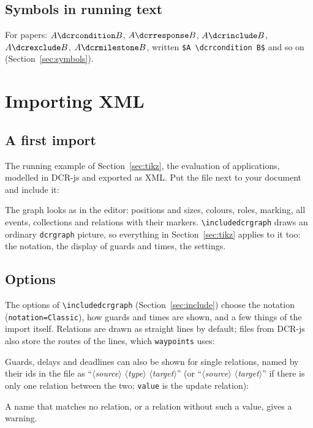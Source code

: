 \documentclass[a4paper,11pt]{article}
\newcommand\example[1]{%
  \begin{tcolorbox}[colback=white, colframe=black!25, boxrule=0.4pt,
      arc=1mm, left=2mm, right=2mm, halign lower=center]
    
    \tcblower
    
  \end{tcolorbox}}
\newcommand\cs[1]{\texttt{\textbackslash#1}}
\newcommand\key[1]{\texttt{#1}}
\newcommand\meta[1]{\ensuremath{\langle}\textit{#1}\ensuremath{\rangle}}
\begin{document}
\subsection{Symbols in running text}
For papers: $A \dcrcondition B$, $A \dcrresponse B$, $A \dcrinclude B$,
$A \dcrexclude B$, $A \dcrmilestone B$, written
\verb|$A \dcrcondition B$| and so on (Section~\ref{sec:symbols}).

\section{Importing XML}\label{sec:import}

\subsection{A first import}
The running example of Section~\ref{sec:tikz}, the evaluation of
applications, modelled in DCR-js and exported as XML. Put the file next to
your document and include it:
\example{import-default}
The graph looks as in the editor: positions and sizes, colours, roles,
marking, all events, collections and relations with their markers.
\cs{includedcrgraph} draws an ordinary \texttt{dcrgraph} picture, so
everything in Section~\ref{sec:tikz} applies to it too: the notation, the
display of guards and times, the settings.

\subsection{Options}
The options of \cs{includedcrgraph} (Section~\ref{sec:include}) choose the
notation (\key{notation=Classic}), how guards and times are shown, and a
few things of the import itself. Relations are drawn as straight lines by
default; files from DCR-js also store the routes of the lines, which
\key{waypoints} uses:
\example{import-waypoints}
Guards, delays and deadlines can also be
shown for single relations, named by their ids in the file as
``\meta{source} \meta{type} \meta{target}'' (or ``\meta{source}
\meta{target}'' if there is only one relation between the two; \key{value}
is the update relation):
\example{import-options}
A name that matches no relation, or a relation without such a value, gives a
warning.
\end{document}
